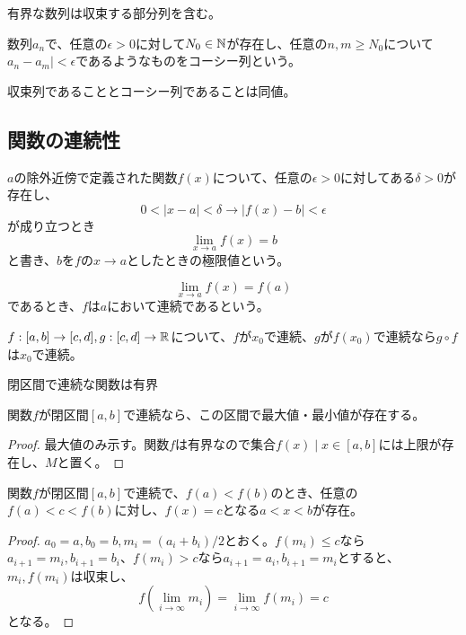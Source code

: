 	\begin{thm}
		有界な数列は収束する部分列を含む。
	\end{thm}

	\begin{dfn}[コーシー列]
		数列${a_n}$で、任意の$\epsilon > 0$に対して$N_0 \in \mathbb{N}$が存在し、任意の$n, m \geq N_0$について$a_n - a_m| < \epsilon$であるようなものをコーシー列という。
	\end{dfn}
	\begin{prop}
		収束列であることとコーシー列であることは同値。
	\end{prop}

\subsection{関数の連続性}
	\begin{dfn}
		$a$の除外近傍で定義された関数$f(x)$について、任意の$\epsilon > 0$に対してある$\delta > 0$が存在し、
			\[0 < |x - a| < \delta \rightarrow |f(x) - b| < \epsilon\]
		が成り立つとき
			\[\lim_{x \to a} f(x) = b\]
		と書き、$b$を$f$の$x \to a$としたときの極限値という。
	\end{dfn}
	\begin{dfn}[関数の連続]
			\[\lim_{x \to a} f(x) = f(a)\]
		であるとき、$f$は$a$において連続であるという。
	\end{dfn}
	\begin{prop}[合成関数の連続性]
		$f : [a, b] \to [c, d], g : [c, d] \to \mathbb{R}$について、$f$が$x_0$で連続、$g$が$f(x_0)$で連続なら$g\circ f$は$x_0$で連続。
	\end{prop}

	\begin{prop}
		閉区間で連続な関数は有界
	\end{prop}
	\begin{thm}
		関数$f$が閉区間$[a, b]$で連続なら、この区間で最大値・最小値が存在する。
	\end{thm}
	\begin{proof}
		最大値のみ示す。関数$f$は有界なので集合${f(x) \mid x \in [a, b]}$には上限が存在し、$M$と置く。
	\end{proof}

	\begin{thm}[中間値の定理]
		関数$f$が閉区間$[a, b]$で連続で、$f(a) < f(b)$のとき、任意の$f(a) < c < f(b)$に対し、$f(x) = c$となる$a < x < b$が存在。
	\end{thm}
	\begin{proof}
		$a_0 = a, b_0 = b, m_i = (a_i + b_i)/2$とおく。$f(m_i) \leq c$なら$a_{i+1} = m_i, b_{i+1} = b_i$、$f(m_i) > c$なら$a_{i+1} = a_i, b_{i+1} = m_i$とすると、$m_i, f(m_i)$は収束し、
			\[f(\lim_{i \to \infty} m_i) = \lim_{i \to \infty} f(m_i) = c\]
		となる。
	\end{proof}

